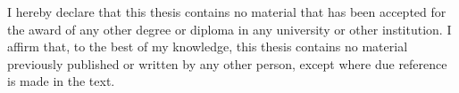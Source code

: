 
\begin{declaration}

I hereby declare that this thesis contains no material that has been accepted for the award of any other degree or diploma in any university or other institution. I affirm that, to the best of my knowledge, this thesis contains no material previously published or written by any other person, except where due reference is made in the text.

\end{declaration}

